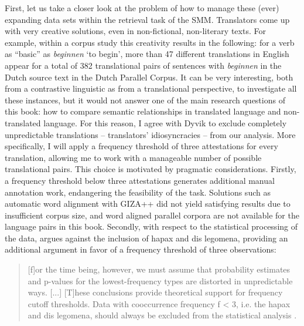 First, let us take a closer look at the problem of how to manage these (ever) expanding data sets within the retrieval task of the SMM. Translators come up with very creative solutions, even in non-fictional, non-literary texts. For example, within a corpus study this creativity results in the following: for a verb as ``basic'' as \textit{beginnen} `to begin', more than 47 different translations in English appear for a total of 382 translational pairs of sentences with \textit{beginnen} in the Dutch source text in the Dutch Parallel Corpus. It can be very interesting, both from a contrastive linguistic as from a translational perspective, to investigate all these instances, but it would not answer one of the main research questions of this book: how to compare semantic relationships in translated language and non-translated language. For this reason, I agree with Dyvik to exclude completely unpredictable translations – translators’ idiosyncracies – from our analysis. More specifically, I will apply a frequency threshold of three attestations for every translation, allowing me to work with a manageable number of possible translational pairs. This choice is motivated by pragmatic considerations. Firstly, a frequency threshold below three attestations generates additional manual annotation work, endangering the feasibility of the task. Solutions such as automatic word alignment with GIZA++ did not yield satisfying results due to insufficient corpus size, and word aligned parallel corpora are not available for the language pairs in this book. Secondly, with respect to the statistical processing of the data, \citet[133]{evert_statistics_2004} argues against the inclusion of hapax and dis legomena, providing an additional argument in favor of a frequency threshold of three observations:

\begin{quote}
[f]or the time being, however, we must assume that probability estimates and p-values for the lowest-frequency types are distorted in unpredictable ways. [...] [T]hese conclusions provide theoretical support for frequency cutoff thresholds. Data with cooccurrence frequency f < 3, i.e. the hapax and dis legomena, should always be excluded from the statistical analysis \citep[133]{evert_statistics_2004}.
\end{quote}

